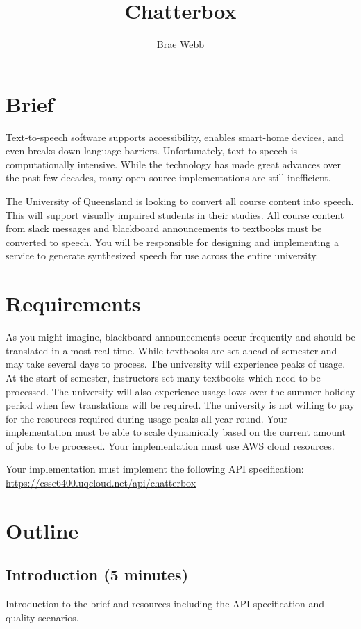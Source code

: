 \documentclass{csse4400}
\title{Chatterbox}
\author{Brae Webb}
\date{\week[tutorial]{10}}
\begin{document}
\maketitle

\section{Brief}

Text-to-speech software supports accessibility,
enables smart-home devices,
and even breaks down language barriers.
Unfortunately, text-to-speech is computationally intensive.
While the technology has made great advances over the past few decades,
many open-source implementations are still inefficient.

The University of Queensland is looking to convert all course content into speech.
This will support visually impaired students in their studies.
All course content from slack messages and blackboard announcements to textbooks must be converted to speech.
You will be responsible for designing and implementing a service to generate synthesized speech for use across the entire university.


\section{Requirements}

As you might imagine,
blackboard announcements occur frequently and should be translated in almost real time.
While textbooks are set ahead of semester and may take several days to process.
The university will experience peaks of usage.
At the start of semester,
instructors set many textbooks which need to be processed.
The university will also experience usage lows over the summer holiday period when few translations will be required.
The university is not willing to pay for the resources required during usage peaks all year round.
Your implementation must be able to scale dynamically based on the current amount of jobs to be processed.
Your implementation must use AWS cloud resources.

Your implementation must implement the following API specification:\\
\url{https://csse6400.uqcloud.net/api/chatterbox}

\section{Outline}

\subsection*{Introduction (5 minutes)}
Introduction to the brief
and resources including the API specification and quality scenarios.
\end{document}
